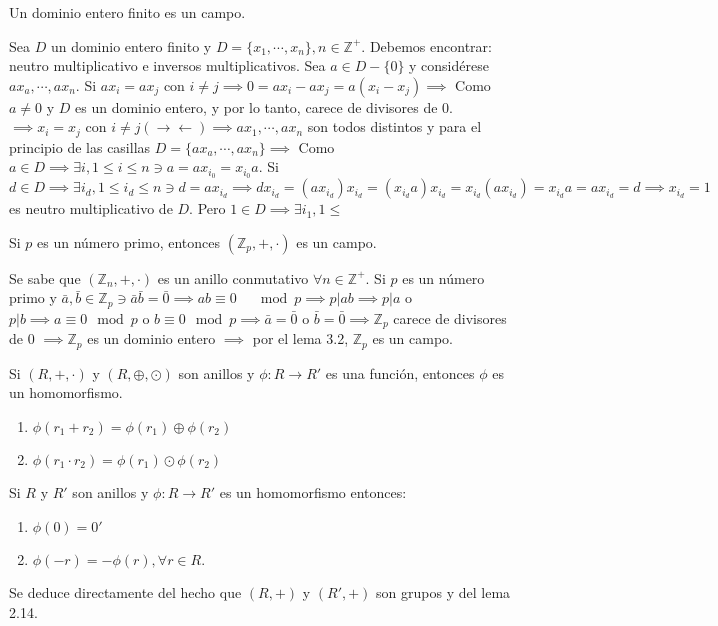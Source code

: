\begin{lema}[3.2]
    Un dominio entero finito es un campo. 
    \begin{dem}
        Sea $D$ un dominio entero finito y $D=\{x_1,\cdots, x_n\},n\in \mathbb{Z}^+$. Debemos encontrar: neutro multiplicativo e inversos multiplicativos. Sea $a\in D-\{0\}$ y considérese $ax_a,\cdots, ax_n$. Si $ax_i=ax_j$ con $i\neq j\implies 0 = ax_i -ax_j =a(x_i-x_j)\implies$ Como $a\neq 0$ y $D$ es un dominio entero, y por lo tanto, carece de divisores de 0. $\implies x_i=x_j$ con $i\neq j (\to\gets)\implies ax_1,\cdots,ax_n$ son todos distintos y para el principio de las casillas $D=\{ax_a,\cdots, ax_n\}\implies $ Como $a\in D\implies \exists i,1\leq i\leq n\ni a=ax_{i_0}=x_{i_0}a$. Si $d\in D\implies \exists i_d,1\leq i_d\leq n\ni d=ax_{i_d}\implies dx_{i_d}=(ax_{i_d})x_{i_d}=(x_{i_d}a)x_{i_d}=x_{i_d}(ax_{i_d})=x_{i_d}a=ax_{i_d}=d\implies x_{i_d}=1$ es neutro multiplicativo de $D$. Pero $1\in D\implies \exists i_1,1\leq $
    \end{dem}
\end{lema}

\begin{corolario}
    Si $p$ es un número primo, entonces $(\mathbb{Z}_p,+,\cdot)$ es un campo. 
    \begin{dem}
        Se sabe que $(\mathbb{Z}_n,+,\cdot)$ es un anillo conmutativo $\forall n\in \mathbb{Z}^+$. Si $p$ es un número primo y $\bar{a},\bar{b}\in\mathbb{Z}_p\ni \bar{a}\bar{b}=\bar{0}\implies ab\equiv 0\quad \mod p\implies p|ab\implies p|a$ o $p|b\implies a\equiv 0\mod p$ o $b\equiv 0\mod p\implies \bar{a}=\bar{0}$ o $\bar{b}=\bar{0}\implies \mathbb{Z}_p$ carece de divisores de 0 $\implies \mathbb{Z}_p$ es un dominio entero $\implies$ por el lema 3.2, $\mathbb{Z}_p$ es un campo.
    \end{dem}
\end{corolario}

\begin{definicion}
    Si $(R,+,\cdot)$ y $(R,\oplus, \odot)$ son anillos y $\phi:R\to R'$ es una función, entonces $\phi$ es un homomorfismo.
    \begin{enumerate}
        \item $\phi(r_1+r_2)=\phi(r_1)\oplus \phi(r_2)$
        \item $\phi(r_1\cdot r_2)=\phi(r_1)\odot \phi(r_2)$
    \end{enumerate}
\end{definicion}

\begin{lema}[3.3]
    Si $R$ y $R'$ son anillos y $\phi: R\to R'$ es un homomorfismo entonces:
    \begin{enumerate}
        \item $\phi(0)=0'$
        \item $\phi(-r)=-\phi(r),\forall r\in R$.
    \end{enumerate}
    \begin{dem}
        Se deduce directamente del hecho que $(R,+)$ y $(R',+)$ son grupos y del lema 2.14. 
    \end{dem}
\end{lema}

